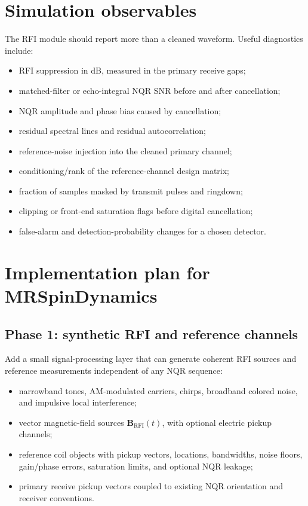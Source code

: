 \documentclass[10pt]{article}
\newcommand{\B}{\mathbf B}
\newcommand{\RFI}{\mathrm{RFI}}
\begin{document}
\section{Simulation observables}

The RFI module should report more than a cleaned waveform.  Useful diagnostics
include:
\begin{itemize}
  \item RFI suppression in dB, measured in the primary receive gaps;
  \item matched-filter or echo-integral NQR SNR before and after cancellation;
  \item NQR amplitude and phase bias caused by cancellation;
  \item residual spectral lines and residual autocorrelation;
  \item reference-noise injection into the cleaned primary channel;
  \item conditioning/rank of the reference-channel design matrix;
  \item fraction of samples masked by transmit pulses and ringdown;
  \item clipping or front-end saturation flags before digital cancellation;
  \item false-alarm and detection-probability changes for a chosen detector.
\end{itemize}

\section{Implementation plan for MRSpinDynamics}

\subsection{Phase 1: synthetic RFI and reference channels}

Add a small signal-processing layer that can generate coherent RFI sources and
reference measurements independent of any NQR sequence:
\begin{itemize}
  \item narrowband tones, AM-modulated carriers, chirps, broadband colored noise,
        and impulsive local interference;
  \item vector magnetic-field sources \(\B_{\RFI}(t)\), with optional electric
        pickup channels;
  \item reference coil objects with pickup vectors, locations, bandwidths, noise
        floors, gain/phase errors, saturation limits, and optional NQR leakage;
  \item primary receive pickup vectors coupled to existing NQR orientation and
        receiver conventions.
\end{itemize}
\end{document}
